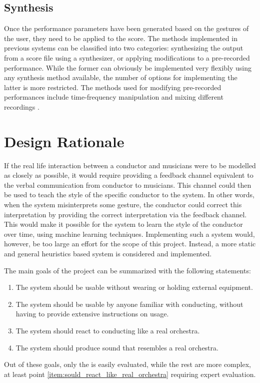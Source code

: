 \subsection{Synthesis}

Once the performance parameters have been generated
based on the gestures of the user,
they need to be applied to the score.
The methods implemented in previous systems can be classified
into two categories:
synthesizing the output from a score file using a synthesizer,
or applying modifications to a pre-recorded performance.
While the former can obviously be implemented very flexibly
using any synthesis method available,
the number of options for implementing the latter is more restricted.
The methods used for modifying pre-recorded performances
include time-frequency manipulation
and mixing different recordings \cite{Borchers2004}.

\section{Design Rationale}
\label{sec:design_rationale}

If the real life interaction between a conductor and musicians
were to be modelled as closely as possible,
it would require providing a feedback channel
equivalent to the verbal communication from conductor to musicians.
This channel could then be used to teach the
style of the specific conductor to the system.
In other words, when the system misinterprets some gesture,
the conductor could correct this interpretation by 
providing the correct interpretation via the feedback channel.
This would make it possible for the system to
learn the style of the conductor over time,
using machine learning techniques.
Implementing such a system would, however,
be too large an effort for the scope of this project.
Instead, a more static and general heuristics based system is
considered and implemented.

The main goals of the project can be
summarized with the following statements:
\begin{enumerate}
\item The system should be usable without wearing or holding external equipment.
\label{item:usable_without_equipment}
\item The system should be usable by anyone familiar with conducting, without having to provide extensive instructions on usage.
\item The system should react to conducting like a real orchestra.
\label{item:sould_react_like_real_orchestra}
\item The system should produce sound that resembles a real orchestra.
\end{enumerate}
Out of these goals,
only the 
is easily evaluated,
while the rest are more complex,
at least point \ref{item:sould_react_like_real_orchestra}
requiring expert evaluation.

